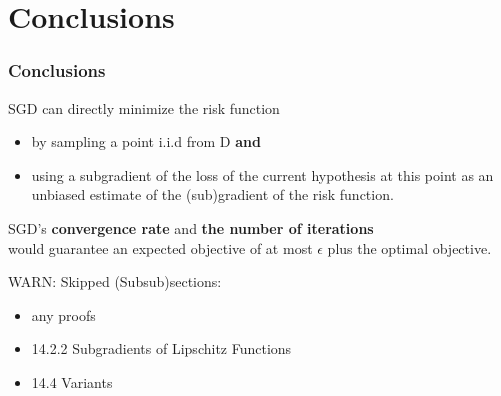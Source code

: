 \section{Conclusions}

\begin{frame}
\frametitle{Conclusions}

SGD can directly minimize the risk function
\begin{itemize}
    \item by sampling a point i.i.d from D \textbf{and}
    \item using a subgradient of the loss of the current hypothesis at this point as
    an unbiased estimate of the (sub)gradient of the risk function.
\end{itemize}
\vspace{5mm}

SGD's \textbf{convergence rate} and \textbf{the number of iterations} \\
would guarantee an expected objective of at most $\epsilon$ plus the optimal objective.
\vspace{5mm}

WARN: Skipped (Subsub)sections:\\
\begin{itemize}
    \item any proofs
    \item 14.2.2 Subgradients of Lipschitz Functions
    \item 14.4 Variants
\end{itemize}

\end{frame}

